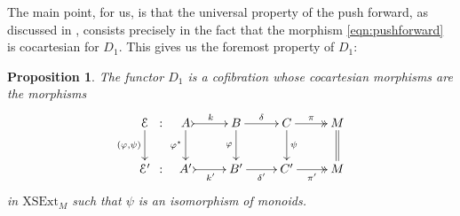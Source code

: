\documentclass[a4paper]{amsart}
\theoremstyle{plain}
\newtheorem{proposition}[subsection]{Proposition}
\theoremstyle{definition}
\theoremstyle{remark}
\begin{document}
The main point, for us, is that the universal property of the push forward, as discussed in \cite{AMMPS}, consists precisely in the fact that the morphism \eqref{eqn:pushforward} is cocartesian for $D_1.$ This gives us the foremost property of $D_1$:
\begin{proposition}
The functor $D_1$ is a cofibration whose cocartesian morphisms are the morphisms
\begin{equation}
\label{eqn:coc_mor}
\begin{aligned}
{\xymatrixcolsep{0.1pc}
\xymatrix{
{\mathcal{E}} \ar[d]_-{(\varphi,\psi)} &{:}\\
{\mathcal{E}'} &{:}
}}
{\xymatrix{
{A} \ar@{>->}[r]^-k \ar[d]_-{\varphi^\star} &B \ar[r]^-{\delta} \ar[d]_-{\varphi} &C \ar@{->>}[r]^-{\pi} \ar[d]^-{\psi} &M\ar@{=}[d]  \\
{A'} \ar@{>->}[r]_-{k'} &{B'} \ar[r]_-{\delta'} &{C'} \ar@{->>}[r]_-{\pi'} &M
}}
\end{aligned}
\end{equation}
in $\mathrm{XSExt}_M$ such that $\psi$ is an isomorphism of monoids.
\end{proposition}
\end{document}
